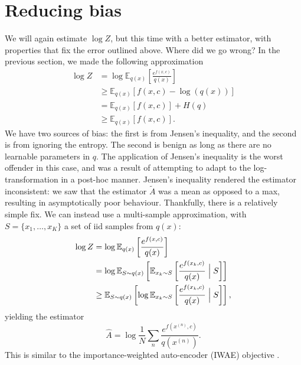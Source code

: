 \documentclass{article}
\newcommand\Es[2]{\mathbb{E}_{#1}\left[#2\right]}
\begin{document}
\section{Reducing bias}
We will again estimate $\log Z$, but this time with a better estimator, with properties that fix the error outlined above.
Where did we go wrong?
In the previous section, we made the following approximation
\begin{equation}
\begin{aligned}
\log Z
&=\log \Es{q(x)}{\frac{e^{f(x, c)}}{q(x)}}\\
&\geq \Es{q(x)}{f(x, c) - \log(q(x))}\\
&= \Es{q(x)}{f(x, c)} + H(q) \\
&\geq \Es{q(x)}{f(x,c)}.
\end{aligned}
\end{equation}
We have two sources of bias: the first is from Jensen's inequality,
and the second is from ignoring the entropy.
The second is benign as long as there are no learnable parameters in $q$.
The application of Jensen's inequality is the worst offender in this case,
and was a result of attempting to adapt to the log-transformation in a post-hoc manner.
Jensen's inequality rendered the estimator inconsistent: we saw that the estimator $\tilde{A}$ was a mean as opposed to a max, resulting in asymptotically poor behaviour.
Thankfully, there is a relatively simple fix.
We can instead use a multi-sample approximation,
with $S = \{x_1, \ldots, x_K\}$ a set of iid samples from $q(x)$:
\begin{equation}
\begin{aligned}
\log Z
&=\log \Es{q(x)}{\frac{e^{f(x, c)}}{q(x)}}\\
&=\log \Es{S \sim q(x)}{
    \Es{x_k \sim S}{\frac{e^{f(x_k, c)}}{q(x)} \Bigm\vert S}
}\\
&\geq\Es{S \sim q(x)}{
    \log \Es{x_k \sim S}{\frac{e^{f(x_k, c)}}{q(x)} \Bigm\vert S}
},
\end{aligned}
\end{equation}
yielding the estimator
\begin{equation}
    \hat{A} = \log \frac{1}{N} \sum_n \frac{e^{f(x^{(n)},c)}}{q(x^{(n)})}.
\end{equation}
This is similar to the importance-weighted auto-encoder (IWAE) objective \citep{iwae}.
\end{document}
